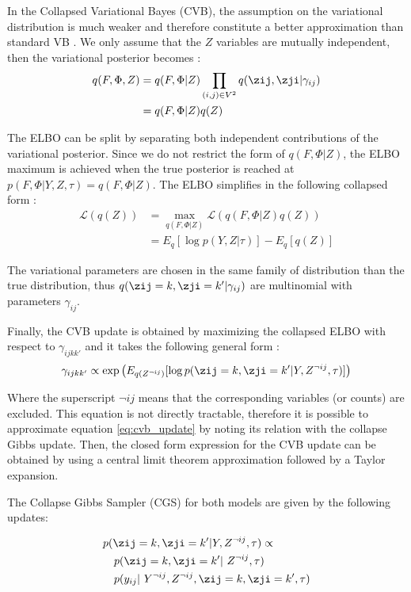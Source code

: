 In the Collapsed Variational Bayes (CVB), the assumption on the variational distribution is much weaker and therefore constitute a better approximation than standard VB \cite{teh2007collapsed}. We only assume that the $Z$ variables are mutually independent, then the variational posterior becomes : 
\begin{align*}
q(F, \Phi, Z) &= q(F,\Phi | Z) \prod_{(i,j)\in V^2}q(\zij, \zji | \gamma_{ij}) \\
	&= q(F, \Phi | Z)q(Z)
\end{align*}

The ELBO can be split by separating both independent contributions of the variational posterior. Since we do not restrict the form of $q(F, \Phi | Z)$, the ELBO maximum is achieved when the true posterior is reached at $p(F, \Phi | Y, Z,  \tau) = q(F, \Phi | Z)$. The ELBO simplifies in the following collapsed form :
\begin{align*}
    \mathcal{L}(q(Z)) &= \max_{q(F,\Phi|Z)} \mathcal{L}(q(F, \Phi|Z)q(Z)) \\
    &= E_q[\log p(Y,Z|\tau)] - E_q[q(Z)]
\end{align*}

The variational parameters are chosen in the same family of distribution than the true distribution, thus $q(\zij=k, \zji=k' | \gamma_{ij})$ are multinomial with parameters $\gamma_{ij}$.

Finally, the CVB update is obtained by maximizing the collapsed ELBO with respect to $\gamma_{ijkk'}$ and it takes the following general form :
\begin{equation} \label{eq:cvb_update}
    \gamma_{ijkk'} \propto \exp \left( E_{q(Z^{\neg ij})} [\log p(\zij=k, \zji=k' |Y, Z^{\neg ij}, \tau)] \right)
\end{equation}

Where the superscript $\neg ij$ means that the corresponding variables (or counts) are excluded.
This equation is not directly tractable, therefore it is possible to approximate equation \eqref{eq:cvb_update} by noting its relation with the collapse Gibbs update. Then,  the closed form expression for the CVB update can be obtained by using a central limit theorem approximation followed by a Taylor expansion.

The Collapse Gibbs Sampler (CGS) for both models are given by the following updates:

\begin{align} \label{eq:post_cgs}
    &p(\zij=k, \zji=k' | Y, Z^{\neg ij}, \tau) \propto  \nonumber\\
    & \quad p(\zij=k, \zji=k' | Z^{\neg ij}, \tau) \nonumber \\
    & \quad p(y_{ij} | Y^{\neg ij}, Z^{\neg ij}, \zij=k, \zji=k', \tau)
\end{align}

